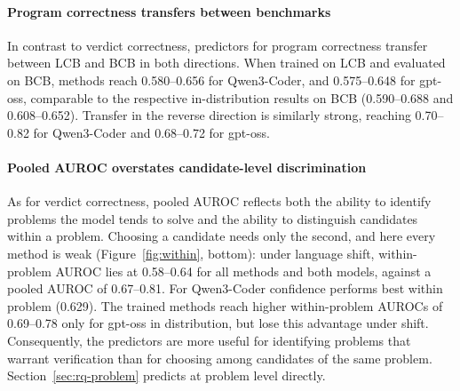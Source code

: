 \paragraph{Program correctness transfers between benchmarks}
In contrast to verdict correctness, predictors for program correctness transfer between LCB and BCB in both directions. When trained on LCB and evaluated on BCB, methods reach 0.580--0.656 for Qwen3-Coder, and 0.575--0.648 for gpt-oss, comparable to
the respective in-distribution results on BCB (0.590--0.688 and 0.608--0.652).
 Transfer in the reverse direction is similarly strong, reaching 0.70--0.82 for Qwen3-Coder and 0.68--0.72 for gpt-oss.
\paragraph{Pooled AUROC overstates candidate-level discrimination}
As for verdict correctness, pooled AUROC reflects both the ability to identify problems the model tends to solve and the ability to distinguish candidates within a problem.
Choosing a candidate needs only the second, and here every method is weak (Figure~\ref{fig:within}, bottom): under language shift, within-problem AUROC lies at 0.58--0.64 for all methods and both models, against a pooled AUROC of 0.67--0.81. For Qwen3-Coder confidence performs best within problem (0.629). 
The trained methods reach higher within-problem AUROCs of 0.69--0.78 only for gpt-oss in distribution, but lose this advantage under shift. Consequently, the predictors are more useful for identifying problems that warrant verification than for choosing among candidates of the same problem.
Section~\ref{sec:rq-problem} predicts at problem level directly.

